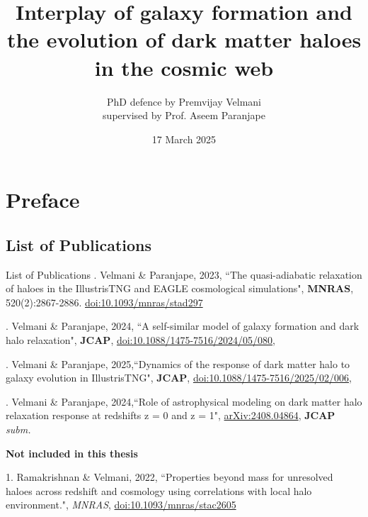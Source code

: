 \documentclass[11pt]{beamer}
\title[PI: Prof. Aseem Paranjape]{Interplay of galaxy formation and the evolution of dark matter haloes in the cosmic web}
\author[Premvijay Velmani]{PhD defence by Premvijay Velmani \\  supervised by Prof. Aseem Paranjape}
\institute[IUCAA]{Inter-University Centre for Astronomy and Astrophysics (IUCAA), India \vspace{0cm}}
\date[]{17 March 2025}
\newcommand{\doi}[1]{\href{https://doi.org/#1}{doi:#1}}
\begin{document}
\begin{frame}
    \maketitle
\end{frame}

\section{Preface}
\subsection*{List of Publications}

\begin{frame}{List of Publications}
. Velmani \& Paranjape, 2023, ``The quasi-adiabatic relaxation of haloes in the IllustrisTNG and EAGLE cosmological simulations", \textbf{MNRAS}, 
{520}(2):2867-2886. 
\doi{10.1093/mnras/stad297}

\vspace{0.1cm}

. Velmani \& Paranjape, 2024, ``A self-similar model of galaxy formation and dark halo relaxation", \textbf{JCAP}, 
\doi{10.1088/1475-7516/2024/05/080},

\vspace{0.1cm}

. Velmani \& Paranjape, 2025,``Dynamics of the response of dark matter halo to galaxy evolution in IllustrisTNG", \textbf{JCAP},
\doi{10.1088/1475-7516/2025/02/006}, 

\vspace{0.1cm}

. Velmani \& Paranjape, 2024,``Role of astrophysical modeling on dark matter halo relaxation response at redshifts z = 0 and z = 1", \href{https://arxiv.org/abs/2408.04864}{arXiv:2408.04864}, \textbf{JCAP} \textit{subm.}

\vspace{0.1cm}

\textbf{Not included in this thesis}

1. Ramakrishnan \& Velmani, 2022, ``Properties beyond mass
for unresolved haloes across redshift and cosmology using correlations with local halo environment.", \textit{MNRAS}, 
\doi{10.1093/mnras/stac2605}
    
\end{frame}
\end{document}
